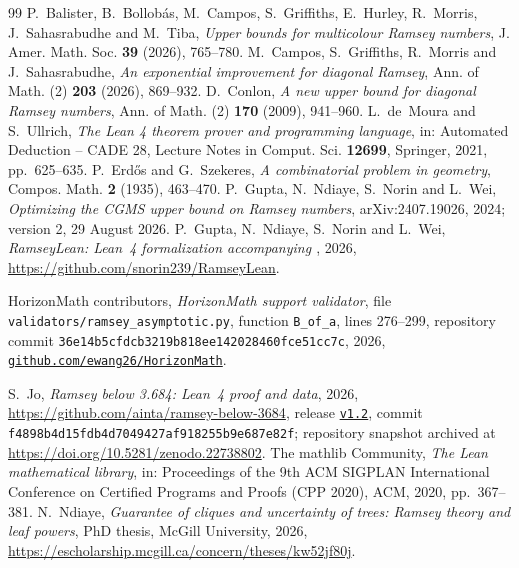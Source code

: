 \documentclass[11pt]{article}
\theoremstyle{definition}
\theoremstyle{remark}
\numberwithin{equation}{section}
\begin{document}
\begin{thebibliography}{99}
P.~Balister, B.~Bollob\'as, M.~Campos, S.~Griffiths, E.~Hurley, R.~Morris,
J.~Sahasrabudhe and M.~Tiba,
\emph{Upper bounds for multicolour Ramsey numbers},
J. Amer. Math. Soc. \textbf{39} (2026), 765--780.
M.~Campos, S.~Griffiths, R.~Morris and J.~Sahasrabudhe,
\emph{An exponential improvement for diagonal Ramsey},
Ann. of Math. (2) \textbf{203} (2026), 869--932.
D.~Conlon,
\emph{A new upper bound for diagonal Ramsey numbers},
Ann. of Math. (2) \textbf{170} (2009), 941--960.
L.~de~Moura and S.~Ullrich,
\emph{The Lean 4 theorem prover and programming language},
in: Automated Deduction -- CADE 28, Lecture Notes in Comput. Sci.
\textbf{12699}, Springer, 2021, pp.~625--635.
P.~Erd\H{o}s and G.~Szekeres,
\emph{A combinatorial problem in geometry},
Compos. Math. \textbf{2} (1935), 463--470.
P.~Gupta, N.~Ndiaye, S.~Norin and L.~Wei,
\emph{Optimizing the CGMS upper bound on Ramsey numbers},
arXiv:2407.19026, 2024; version 2, 29 August 2026.
P.~Gupta, N.~Ndiaye, S.~Norin and L.~Wei,
\emph{RamseyLean: Lean~4 formalization accompanying \cite{GNNW}},
2026, \url{https://github.com/snorin239/RamseyLean}.
{\raggedright
HorizonMath contributors,
\emph{HorizonMath support validator},
file \texttt{validators/ramsey\_asymptotic.py}, function \texttt{B\_of\_a},
lines 276--299, repository commit
\texttt{36e14b5cfdcb3219b818ee142028460fce51cc7c}, 2026,
\href{https://github.com/ewang26/HorizonMath/blob/36e14b5cfdcb3219b818ee142028460fce51cc7c/validators/ramsey_asymptotic.py}
{\nolinkurl{github.com/ewang26/HorizonMath}}.\par}
S.~Jo,
\emph{Ramsey below 3.684: Lean~4 proof and data},
2026, \url{https://github.com/ainta/ramsey-below-3684},
release \href{https://github.com/ainta/ramsey-below-3684/releases/tag/v1.2}{\texttt{v1.2}},
commit \texttt{f4898b4d15fdb4d7049427af918255b9e687e82f};
repository snapshot archived at \url{https://doi.org/10.5281/zenodo.22738802}.
The mathlib Community,
\emph{The Lean mathematical library},
in: Proceedings of the 9th ACM SIGPLAN International Conference on
Certified Programs and Proofs (CPP 2020), ACM, 2020, pp.~367--381.
N.~Ndiaye,
\emph{Guarantee of cliques and uncertainty of trees: Ramsey theory and
leaf powers},
PhD thesis, McGill University, 2026,
\url{https://escholarship.mcgill.ca/concern/theses/kw52jf80j}.

\end{thebibliography}
\end{document}
